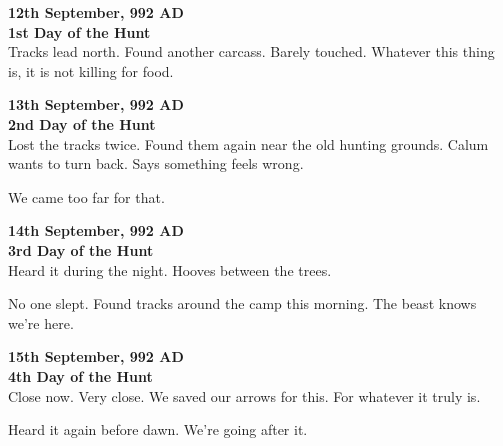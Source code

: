 \begin{LeatherBoundJournal}[bloodied, font=\notefont, fontsize=12pt]
\JournalPageBreak
{\entryfont\textbf{12th September, 992 AD}}\\
{\entryfont\fontsize{9}{10.8}\selectfont\textbf{1st Day of the Hunt}}\\
Tracks lead north. Found another carcass. Barely touched. Whatever this thing is, it is not killing for food.\\\vspace*{\fontdimen6\font}

{\entryfont\textbf{13th September, 992 AD}}\\
{\entryfont\fontsize{9}{10.8}\selectfont\textbf{2nd Day of the Hunt}}\\
Lost the tracks twice. Found them again near the old hunting grounds. Calum wants to turn back. Says something feels wrong.

We came too far for that.\\\vspace*{\fontdimen6\font}

{\entryfont\textbf{14th September, 992 AD}}\\
{\entryfont\fontsize{9}{10.8}\selectfont\textbf{3rd Day of the Hunt}}\\
Heard it during the night. Hooves between the trees.

No one slept. Found tracks around the camp this morning. The beast knows we're here.\\\vspace*{\fontdimen6\font}

{\entryfont\textbf{15th September, 992 AD}}\\
{\entryfont\fontsize{9}{10.8}\selectfont\textbf{4th Day of the Hunt}}\\
Close now. Very close. We saved our arrows for this. For whatever it truly is.

Heard it again before dawn. We're going after it.
\end{LeatherBoundJournal}